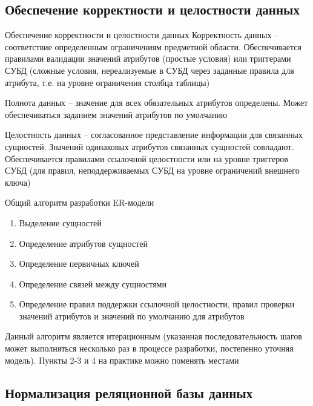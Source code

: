 \documentclass[12pt]{article}
\begin{document}
\newpage 

\subsection{Обеспечение корректности и целостности данных}

\begin{defin}{Обеспечение корректности и целостности данных}
    Корректность данных -- соответствие определенным ограничениям предметной области. Обеспечивается правилами валидации значений атрибутов (простые условия) или триггерами СУБД (сложные условия, нереализуемые в СУБД через заданные правила для атрибута, т.е. на уровне ограничения столбца таблицы)

    Полнота данных -- значение для всех обязательных атрибутов определены. Может обеспечиваться заданием значений атрибутов по умолчанию 

    Целостность данных -- согласованное представление информации для связанных сущностей. Значений одинаковых атрибутов связанных сущностей совпадают. Обеспечивается правилами ссылочной целостности или на уровне триггеров СУБД (для правил, неподдерживаемых СУБД на уровне ограничений внешнего ключа)
\end{defin}

\begin{nota}{Общий алгоритм разработки ER-модели}
    \begin{enumerate}
        \item Выделение сущностей 
        \item Определение атрибутов сущностей
        \item Определение первичных ключей 
        \item Определение связей между сущностями 
        \item Определение правил поддержки ссылочной целостности, правил проверки значений атрибутов и значений по умолчанию для атрибутов
    \end{enumerate}

    Данный алгоритм является итерационным (указанная последовательность шагов может выполняться несколько раз в процессе разработки, постепенно уточняя модель). Пункты 2-3 и 4 на практике можно поменять местами 
\end{nota}

\newpage

\subsection{Нормализация реляционной базы данных}
\end{document}
